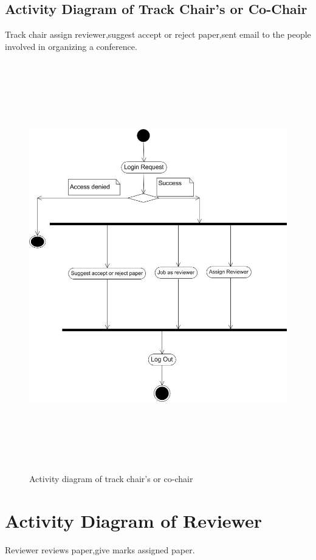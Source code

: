 \subsection{Activity Diagram of Track Chair’s or Co-Chair}
Track chair assign reviewer,suggest accept or reject paper,sent email to the people involved in organizing a conference.
\begin{figure}[h!]
\centering
  \includegraphics[width=6in,height=7in]{pic/track}
  \caption{Activity diagram of track chair’s or co-chair}\label{activitya}
\end{figure}


\section{Activity Diagram of Reviewer}
Reviewer reviews paper,give marks assigned paper.

